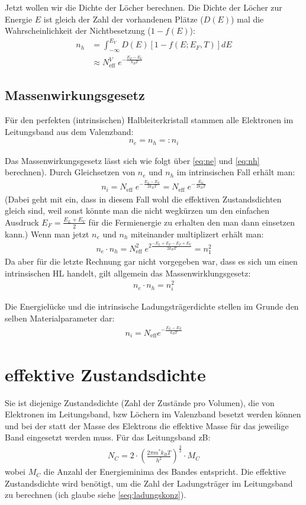 \documentclass[paper=a4,10pt]{scrartcl}
\begin{document}
Jetzt wollen wir die Dichte der Löcher berechnen. Die Dichte der Löcher zur Energie $E$ ist gleich der Zahl der vorhandenen Plätze ($D(E)$) mal die Wahrscheinlichkeit der Nichtbesetzung ($1-f(E)$):
\begin{align}
\label{eq:nh}
n_h &= \int_{-\infty}^{E_V} D(E) [1-f(E; E_F, T)] dE \\
&\approx N^V_{\text{eff}} \;  e^{-\frac{E_F-E_V}{k_B T}}
\end{align}
\subsection{Massenwirkungsgesetz}
Für den perfekten (intrinsischen) Halbleiterkristall stammen alle Elektronen im Leitungsband aus dem Valenzband:
\begin{align}
n_e = n_h =: n_i
\end{align}

Das Massenwirkungsgesetz lässt sich wie folgt über \ref{eq:ne} und \ref{eq:nh} berechnen). Durch Gleichsetzen von $n_e$ und $n_h$ im intrinsischen Fall erhält man:
\begin{align}
n_i = N_{\text{eff}} \; e^{-\frac{E_L-E_V}{2k_BT}} = N_{\text{eff}} \; e^{-\frac{E_G}{2k_BT}}
\end{align}
(Dabei geht mit ein, dass in diesem Fall wohl die effektiven Zustandsdichten gleich sind, weil sonst könnte man die nicht wegkürzen um den einfachen Ausdruck $E_F = \frac{E_L + E_V}{2}$ für die Fermienergie zu erhalten den man dann einsetzen kann.)
Wenn man jetzt $n_e$ und $n_h$ miteinander multiplizert erhält man:
\begin{align}
n_e \cdot n_h = N^2_{\text{eff}} \; e^{2\frac{-E_L + E_F - E_F + E_V}{2k_BT}} = n_1^2
\end{align}
Da aber für die letzte Rechnung gar nicht vorgegeben war, dass es sich um einen intrinsischen HL handelt, gilt allgemein das Massenwirklungsgesetz:
\begin{align}
n_e \cdot n_h = n_i^2
\end{align}

Die Energielücke und die intrinsische Ladungsträgerdichte stellen im Grunde den selben Materialparameter dar:
\begin{align}
n_i = N_{\text{eff}} e^{- \frac{E_L-E_F}{k_BT}}
\end{align}
\section{effektive Zustandsdichte}
\label{sec:effZD}
Sie ist diejenige Zustandsdichte (Zahl der Zustände pro Volumen), die von Elektronen im Leitungsband, bzw Löchern im Valenzband besetzt werden können und bei der statt der Masse des Elektrons die effektive Masse für das jeweilige Band eingesetzt werden muss.
Für das Leitungsband zB:
\begin{align}
N_C = 2 \cdot \left( \frac{2 \pi m^* k_B T}{h^2} \right)^{\frac{3}{2}} \cdot M_C
\end{align}
wobei $M_C$ die Anzahl der Energieminima des Bandes entspricht. Die effektive Zustandsdichte wird benötigt, um die Zahl der Ladungsträger im Leitungsband zu berechnen (ich glaube siehe \ref{seq:ladungskonz}).
\end{document}
